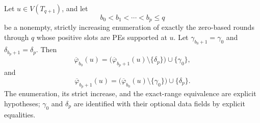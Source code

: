 \begin{lemma}
Let \(u\in V(T_{q+1})\), and let
\[
 b_0<b_1<\cdots<b_p\leq q
\]
be a nonempty, strictly increasing enumeration of exactly the zero-based
rounds through \(q\) whose positive slots are PEs supported at \(u\).
Let \(\gamma_{b_0+1}=\gamma_0\) and
\(\delta_{b_p+1}=\delta_p\).  Then
\[
 \overline\varphi_{b_0}(u)
   =\bigl(\overline\varphi_{b_p+1}(u)\setminus\{\delta_p\}\bigr)
      \cup\{\gamma_0\},                                        \tag{1}
\]
and
\[
 \overline\varphi_{b_p+1}(u)
   =\bigl(\overline\varphi_{b_0}(u)\setminus\{\gamma_0\}\bigr)
      \cup\{\delta_p\}.                                       \tag{2}
\]
The enumeration, its strict increase, and the exact-range equivalence are
explicit hypotheses; \(\gamma_0\) and \(\delta_p\) are identified with
their optional data fields by explicit equalities.
\end{lemma}

